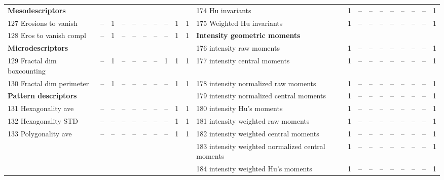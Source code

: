 \documentclass[sn-mathphys,Numbered]{sn-jnl}%
\theoremstyle{thmstyleone}%
\theoremstyle{thmstyletwo}%
\theoremstyle{thmstylethree}%
\begin{document}
\begin{table} [!hbt]
\begin{tiny}
\begin{tabular} {l c c c c c c c c c l c c c c c c c c c }
\hspace{2mm}  \bf Mesodescriptors \rm &  &  &  &  &  &  &  &  &  &  174 Hu invariants & 1 & -- & -- & -- & -- & -- & -- & -- & 1 \\
 127 Erosions to vanish & -- & 1 & -- & -- & -- & -- & -- & 1 & 1 &  175 Weighted Hu invariants & 1 & -- & -- & -- & -- & -- & -- & -- & 1 \\
 128 Eros to vanish compl & -- & 1 & -- & -- & -- & -- & -- & 1 & 1 & \hspace{2mm}  \bf Intensity geometric moments \rm &  &  &  &  &  &  &  &  &  \\
\hspace{2mm}  \bf Microdescriptors \rm &  &  &  &  &  &  &  &  &  &  176 intensity raw moments & 1 & -- & -- & -- & -- & -- & -- & -- & 1 \\
 129 Fractal dim boxcounting & -- & 1 & -- & -- & -- & -- & 1 & 1 & 1 &  177 intensity central moments & 1 & -- & -- & -- & -- & -- & -- & -- & 1 \\
 130 Fractal dim perimeter & -- & 1 & -- & -- & -- & -- & -- & 1 & 1 &  178 intensity normalized raw moments & 1 & -- & -- & -- & -- & -- & -- & -- & 1 \\
\hspace{2mm}  \bf Pattern descriptors \rm &  &  &  &  &  &  &  &  &  &  179 intensity normalized central moments & 1 & -- & -- & -- & -- & -- & -- & -- & 1 \\
 131 Hexagonality ave & -- & -- & -- & -- & -- & -- & -- & 1 & 1 &  180 intensity Hu's moments & 1 & -- & -- & -- & -- & -- & -- & -- & 1 \\
 132 Hexagonality STD & -- & -- & -- & -- & -- & -- & -- & 1 & 1 &  181 intensity weighted raw moments & 1 & -- & -- & -- & -- & -- & -- & -- & 1 \\
 133 Polygonality ave & -- & -- & -- & -- & -- & -- & -- & 1 & 1 &  182 intensity weighted central moments & 1 & -- & -- & -- & -- & -- & -- & -- & 1 \\
   &  &  &  &  &  &  &  &  &  &  183 intensity weighted normalized central moments & 1 & -- & -- & -- & -- & -- & -- & -- & 1 \\
   &  &  &  &  &  &  &  &  &  &  184 intensity weighted Hu's moments & 1 & -- & -- & -- & -- & -- & -- & -- & 1 \\

\bottomrule
\end{tabular}
\end{tiny}
\end{table}
\end{document}
